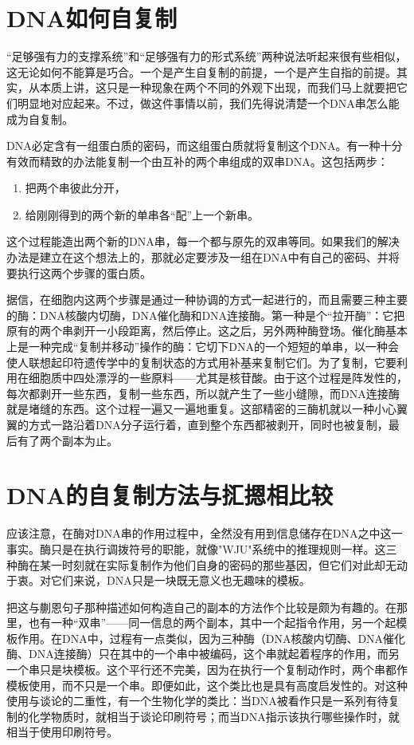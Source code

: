 \section{DNA如何自复制}

“足够强有力的支撑系统”和“足够强有力的形式系统”两种说法听起来很有些相似，这无论如何不能算是巧合。一个是产生自复制的前提，一个是产生自指的前提。其实，从本质上讲，这只是一种现象在两个不同的外观下出现，而我们马上就要把它们明显地对应起来。不过，做这件事情以前，我们先得说清楚一个DNA串怎么能成为自复制。

DNA必定含有一组蛋白质的密码，而这组蛋白质就将复制这个DNA。有一种十分有效而精致的办法能复制一个由互补的两个串组成的双串DNA。这包括两步：
\begin{enumerate}
\item 把两个串彼此分开，
\item 给刚刚得到的两个新的单串各“配”上一个新串。
\end{enumerate}
这个过程能造出两个新的DNA串，每一个都与原先的双串等同。如果我们的解决办法是建立在这个想法上的，那就必定要涉及一组在DNA中有自己的密码、并将要执行这两个步骤的蛋白质。

据信，在细胞内这两个步骤是通过一种协调的方式一起进行的，而且需要三种主要的酶：DNA核酸内切酶，DNA催化酶和DNA连接酶。第一种是个“拉开酶”：它把原有的两个串剥开一小段距离，然后停止。这之后，另外两种酶登场。催化酶基本上是一种完成“复制并移动”操作的酶：它切下DNA的一个短短的单串，以一种会使人联想起印符遗传学中的复制状态的方式用补基来复制它们。为了复制，它要利用在细胞质中四处漂浮的一些原料——尤其是核苷酸。由于这个过程是阵发性的，每次都剥开一些东西，复制一些东西，所以就产生了一些小缝隙，而DNA连接酶就是堵缝的东西。这个过程一遍又一遍地重复。这部精密的三酶机就以一种小心翼翼的方式一路沿着DNA分子运行着，直到整个东西都被剥开，同时也被复制，最后有了两个副本为止。

\section{DNA的自复制方法与㧟摁相比较}

应该注意，在酶对DNA串的作用过程中，全然没有用到信息储存在DNA之中这一事实。酶只是在执行调拨符号的职能，就像"WJU"系统中的推理规则一样。这三种酶在某一时刻就在实际复制作为他们自身的密码的那些基因，但它们对此却无动于衷。对它们来说，DNA只是一块既无意义也无趣味的模板。

把这与蒯恩句子那种描述如何构造自己的副本的方法作个比较是颇为有趣的。在那里，也有一种“双串”——同一信息的两个副本，其中一个起指令作用，另一个起模板作用。在DNA中，过程有一点类似，因为三种酶（DNA核酸内切酶、DNA催化酶、DNA连接酶）只在其中的一个串中被编码，这个串就起着程序的作用，而另一个串只是块模板。这个平行还不完美，因为在执行一个复制动作时，两个串都作模板使用，而不只是一个串。即便如此，这个类比也是具有高度启发性的。对这种使用与谈论的二重性，有一个生物化学的类比：当DNA被看作只是一系列有待复制的化学物质时，就相当于谈论印刷符号；而当DNA指示该执行哪些操作时，就相当于使用印刷符号。

